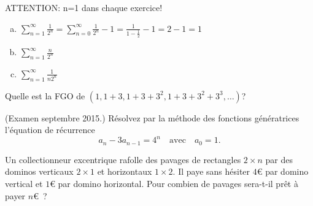 ATTENTION: n=1 dans chaque exercice!

\begin{enumerate}[a)]
\item $\displaystyle \sum_{n=1}^\infty \frac{1}{2^n} = \sum_{n=0}^\infty \frac{1}{2^n} - 1 = \frac{1}{1-\frac{1}{2}} - 1 = 2 - 1 = 1 $
\item $\displaystyle \sum_{n=1}^\infty \frac{n}{2^n}$
\item $\displaystyle \sum_{n=1}^\infty \frac{1}{n 2^n}$ 
\end{enumerate}


\begin{exo}
Quelle est la FGO de $(1,1+3,1+3+3^2,1+3+3^2+3^3,\ldots)$?
\end{exo}


\begin{exo} (Examen septembre 2015.)
R\'esolvez par la m\'ethode des fonctions g\'en\'eratrices l'\'equation de r\'ecurrence 
$$
a_n-3a_{n-1}=4^n \quad \mathrm{avec} \quad a_0=1.
$$
\end{exo}


\begin{exo}
Un collectionneur excentrique rafolle des pavages de rectangles $2 \times n$ par des dominos verticaux $2 \times 1$ et horizontaux $1 \times 2$. Il paye sans h\'esiter $4$\euro{} par domino vertical et $1$\euro{} par domino horizontal. Pour combien de pavages sera-t-il pr\^et \`a payer $n$\euro~?
\end{exo}

